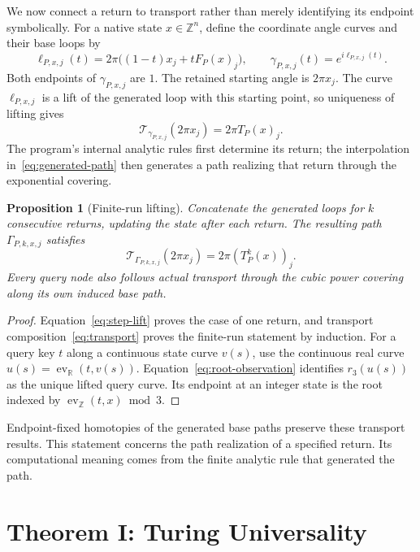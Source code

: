 \documentclass[11pt]{article}
\numberwithin{equation}{section}
\newtheorem{proposition}[theorem]{Proposition}
\theoremstyle{definition}
\theoremstyle{remark}
\newcommand{\Z}{\mathbb Z}
\newcommand{\R}{\mathbb R}
\newcommand{\ev}{\operatorname{ev}}
\begin{document}
We now connect a return to transport rather than merely identifying its
endpoint symbolically. For a native state $x\in\Z^n$, define the
coordinate angle curves and their base loops by
\begin{equation}\label{eq:generated-path}
 \ell_{P,x,j}(t)=2\pi\big((1-t)x_j+tF_P(x)_j\big),\qquad
 \gamma_{P,x,j}(t)=e^{i\ell_{P,x,j}(t)}.
\end{equation}
Both endpoints of $\gamma_{P,x,j}$ are $1$. The retained starting
angle is $2\pi x_j$. The curve $\ell_{P,x,j}$ is a lift of the
generated loop with this starting point, so uniqueness of lifting gives
\begin{equation}\label{eq:step-lift}
 \mathcal T_{\gamma_{P,x,j}}(2\pi x_j)=2\pi T_P(x)_j.
\end{equation}
The program's internal analytic rules first determine its return; the
interpolation in~\eqref{eq:generated-path} then generates a path
realizing that return through the exponential covering.

\begin{proposition}[Finite-run lifting]\label{prop:lifting}
Concatenate the generated loops for $k$ consecutive returns, updating
the state after each return. The resulting path $\Gamma_{P,k,x,j}$
satisfies
\begin{equation}\label{eq:run-lift}
 \mathcal T_{\Gamma_{P,k,x,j}}(2\pi x_j)=2\pi(T_P^k(x))_j.
\end{equation}
Every query node also follows actual transport through the cubic power
covering along its own induced base path.
\end{proposition}
\begin{proof}
Equation~\eqref{eq:step-lift} proves the case of one return, and
transport composition~\eqref{eq:transport} proves the finite-run
statement by induction. For a query key $t$ along a continuous state
curve $v(s)$, use the continuous real curve
$u(s)=\ev_\R(t,v(s))$. Equation~\eqref{eq:root-observation} identifies
$r_3(u(s))$ as the unique lifted query curve. Its endpoint at an integer
state is the root indexed by $\ev_\Z(t,x)\bmod3$.
\end{proof}

Endpoint-fixed homotopies of the generated base paths preserve these
transport results. This statement concerns the path realization of a
specified return. Its computational meaning comes from the finite
analytic rule that generated the path.

\section{Theorem I: Turing Universality}
\label{sec:universality}
\end{document}
